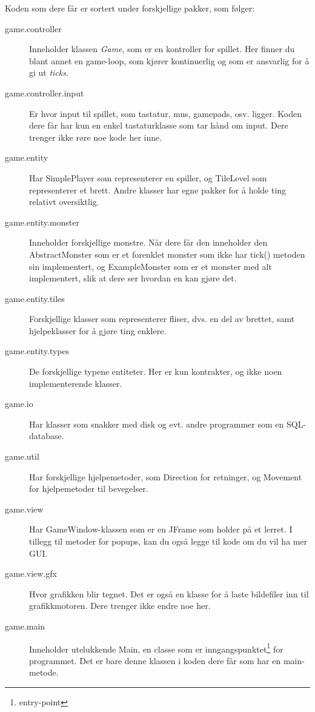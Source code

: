 \documentclass[norsk]{article}
\begin{document}
Koden som dere får er sortert under forskjellige pakker, som følger:
\begin{description}
\item [game.controller] Inneholder klassen \emph{Game}, som er en kontroller for spillet.
  Her finner du blant annet en game-loop, som kjører kontinuerlig og som er ansvarlig for å gi ut \emph{ticks}.
\item [game.controller.input] Er hvor input til spillet, som tastatur, mus, gamepads, osv. ligger. Koden dere får har kun en enkel tastaturklasse som tar hånd om input. Dere trenger ikke røre noe kode her inne.
\item [game.entity] Har SimplePlayer som representerer en spiller, og TileLevel som representerer et brett. Andre klasser har egne pakker for å holde ting relativt oversiktlig.
\item [game.entity.monster] Inneholder forskjellige monstre. Når dere får den inneholder den AbstractMonster som er et forenklet monster som ikke har tick() metoden sin implementert, og ExampleMonster som er et monster med alt implementert, slik at dere ser hvordan en kan gjøre det.
\item [game.entity.tiles] Forskjellige klasser som representerer fliser, dvs. en del av brettet, samt hjelpeklasser for å gjøre ting enklere.
\item [game.entity.types] De forskjellige typene entiteter. Her er kun kontrakter, og ikke noen implementerende klasser.
\item [game.io] Har klasser som snakker med disk og evt. andre programmer som en SQL-database.
\item [game.util] Har forskjellige hjelpemetoder, som Direction for retninger, og Movement for hjelpemetoder til bevegelser.
\item [game.view] Har GameWindow-klassen som er en JFrame som holder på et lerret.
  I tillegg til metoder for popups, kan du også legge til kode om du vil ha mer GUI.
\item [game.view.gfx] Hvor grafikken blir tegnet. Det er også en klasse for å laste bildefiler inn til grafikkmotoren. Dere trenger ikke endre noe her. %
\item [game.main] Inneholder utelukkende Main, en classe som er inngangspunktet\footnote{entry-point} for programmet. Det er bare denne klassen i koden dere får som har en main-metode.
\end{description}
\end{document}
